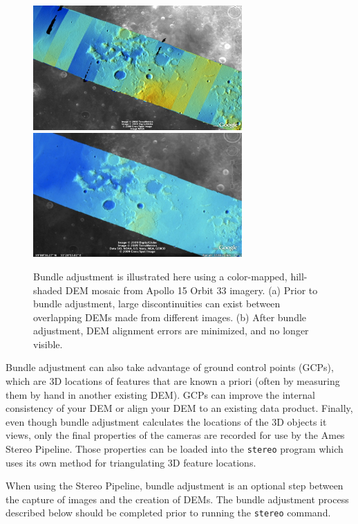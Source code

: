 \begin{figure}[bt]
  \centering
  \includegraphics[width=8cm]{images/ba_orig}
  \includegraphics[width=8cm]{images/ba_adjusted}
  \caption{Bundle adjustment is illustrated here using a color-mapped,
    hill-shaded DEM mosaic from Apollo 15 Orbit 33 imagery. (a)
    Prior to bundle adjustment, large discontinuities can exist between
    overlapping DEMs made from different images. (b) After bundle
    adjustment, DEM alignment errors are minimized, and no longer visible.}
  \label{fig:bundle_adjustment}
\end{figure}

Bundle adjustment can also take advantage of ground control points
(GCPs), which are 3D locations of features that are known a
  priori (often by measuring them by hand in another existing
DEM). GCPs can improve the internal consistency of your DEM or align
your DEM to an existing data product. Finally, even though bundle
adjustment calculates the locations of the 3D objects it views, only
the final properties of the cameras are recorded for use by the Ames
Stereo Pipeline. Those properties can be loaded into the \texttt{stereo}
program which uses its own method for triangulating 3D feature
locations.

When using the Stereo Pipeline, bundle adjustment is an optional step
between the capture of images and the creation of DEMs.  The bundle
adjustment process described below should be completed prior to
running the \texttt{stereo} command.

\begin{center}
\end{center}


